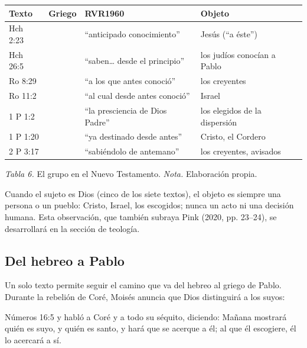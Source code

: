 \begin{center}\small\renewcommand{\arraystretch}{1.2}
\begin{tabular}{@{}L{1.7cm}L{3.1cm}L{4.9cm}L{4.7cm}@{}}
\toprule
\textbf{Texto} & \textbf{Griego} & \textbf{RVR1960} & \textbf{Objeto} \\ \midrule
Hch 2:23 &  & ``anticipado conocimiento'' & Jesús (``a éste'') \\
Hch 26:5 &  & ``saben\ldots{} desde el principio'' & los judíos conocían a Pablo \\
Ro 8:29 &  & ``a los que antes conoció'' & los creyentes \\
Ro 11:2 &  & ``al cual desde antes conoció'' & Israel \\
1 P 1:2 &  & ``la presciencia de Dios Padre'' & los elegidos de la dispersión \\
1 P 1:20 &  & ``ya destinado desde antes'' & Cristo, el Cordero \\
2 P 3:17 &  & ``sabiéndolo de antemano'' & los creyentes, avisados \\
\bottomrule
\end{tabular}\par
{\footnotesize\color{gris}\textit{Tabla 6.} El grupo  en el Nuevo Testamento. \textit{Nota.} Elaboración propia.}
\end{center}

Cuando el sujeto es Dios (cinco de los siete textos), el objeto es siempre una persona o un pueblo: Cristo, Israel, los escogidos; nunca un acto ni una decisión humana. Esta observación, que también subraya Pink (2020, pp. 23--24), se desarrollará en la sección de teología.

\subsection{Del hebreo a Pablo}
Un solo texto permite seguir el camino que va del hebreo al griego de Pablo. Durante la rebelión de Coré, Moisés anuncia que Dios distinguirá a los suyos:

\begin{verso}{Números 16:5}
y habló a Coré y a todo su séquito, diciendo: Mañana mostrará \SENOR{} quién es suyo, y quién es santo, y hará que se acerque a él; al que él escogiere, él lo acercará a sí.
\end{verso}


